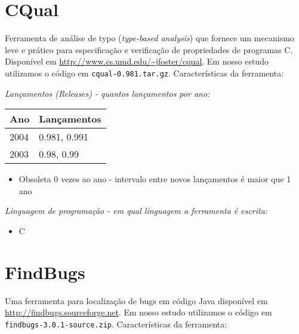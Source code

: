 \section{CQual}

Ferramenta de análise de typo ({\it type-based analysis}) que fornece um
mecanismo leve e prático para especificação e verificação de propriedades de
programas C. Disponível em \url{http://www.cs.umd.edu/~jfoster/cqual}. Em
nosso estudo utilizamos o código em \texttt{cqual-0.981.tar.gz}.
Características da ferramenta:

\begin{description}

  \item {\it Lançamentos ({\it Releases}) - quantos lançamentos por ano:}
    \begin{table}[h!]
      \centering
      \begin{tabular}{| l | l |}
        \hline
        Ano  & Lançamentos  \\
        \hline
        2004 & 0.981, 0.991 \\
        2003 & 0.98, 0.99   \\
        \hline
      \end{tabular}
    \end{table}
    \begin{itemize}
      \item Obsoleta $0$ vezes ao ano - intervalo entre novos lançamentos é maior que 1 ano
    \end{itemize}

  \item {\it Linguagem de programação - em qual linguagem a ferramenta é escrita:}
    \begin{itemize}
      \item C
    \end{itemize}

\end{description}

\section{FindBugs}

Uma ferramenta para localização de bugs em código Java disponível em
\url{http://findbugs.sourceforge.net}. Em nosso estudo utilizamos o código em
\texttt{findbugs-3.0.1-source.zip}. Características da ferramenta:

